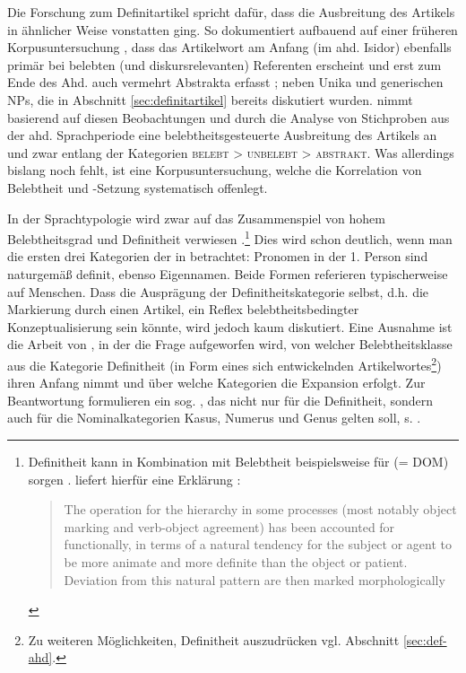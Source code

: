 Die Forschung zum Definitartikel spricht dafür, dass die Ausbreitung des Artikels in ähnlicher Weise vonstatten ging. So dokumentiert \textcite[73ff.]{Oubouzar1992} aufbauend auf einer früheren Korpusuntersuchung \parencite{Oubouzar1989}, dass das  Artikelwort  am Anfang (im ahd. Isidor) ebenfalls primär bei belebten (und diskursrelevanten) Referenten erscheint \parencite[vgl. insbesondere][566--567]{Oubouzar1989} und erst zum Ende des Ahd. auch vermehrt Abstrakta erfasst \parencite[][572]{Oubouzar1989}; neben Unika und generischen NPs, die in Abschnitt \ref{sec:definitartikel} bereits diskutiert wurden. \textcite[74ff.]{Szczepaniak2011} nimmt basierend auf diesen Beobachtungen und durch die Analyse von Stichproben aus der ahd. Sprachperiode eine belebtheitsgesteuerte Ausbreitung des Artikels an und zwar entlang der Kategorien \textsc{belebt > unbelebt > abstrakt}. Was allerdings bislang noch fehlt, ist eine Korpusuntersuchung, welche die Korrelation von Belebtheit und -Setzung systematisch offenlegt. 

In der Sprachtypologie wird zwar auf das Zusammenspiel von hohem Belebtheitsgrad und Definitheit verwiesen \parencites()()[s. z.B.][53]{Dahl1996}[][166f.]{Croft2006}.\footnote{Definitheit kann in Kombination mit Belebtheit beispielsweise für  (= DOM) sorgen \parencite{Aissen2003}. \textcite{Lyons1999} liefert hierfür eine Erklärung \parencite[ähnlich argumentiert auch][119]{Croft1995}: \blockcquote[2014]{Lyons1999}{The operation for the hierarchy in some processes (most notably object marking and verb-object agreement) has been accounted for functionally, in terms of a natural tendency for the subject or agent to be more animate and more definite than the object or patient. Deviation from this natural pattern are then marked morphologically}.}
Dies wird schon deutlich,  wenn man die ersten drei Kategorien der  in  betrachtet: Pronomen in der 1. Person sind naturgemäß definit, ebenso Eigennamen. Beide Formen referieren typischerweise auf Menschen. Dass die Ausprägung der Definitheitskategorie selbst, d.h. die  Markierung durch einen Artikel, ein Reflex belebtheitsbedingter Konzeptualisierung sein könnte, wird jedoch kaum diskutiert. Eine Ausnahme ist die Arbeit von \textcite{Enger2011}, in der die Frage aufgeworfen wird, von welcher Belebtheitsklasse aus die Kategorie Definitheit (in Form eines sich entwickelnden Artikelwortes\footnote{Zu weiteren Möglichkeiten, Definitheit auszudrücken vgl. Abschnitt \ref{sec:def-ahd}.}) ihren Anfang nimmt und über welche Kategorien die Expansion erfolgt. Zur Beantwortung formulieren \textcite[206]{Enger2011} ein sog. , das nicht nur für die Definitheit, sondern auch für die Nominalkategorien Kasus, Numerus und Genus gelten soll, s. . 
   
